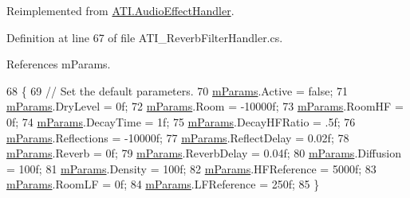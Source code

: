 Reimplemented from \hyperlink{class_a_t_i_1_1_audio_effect_handler_a9f2b5ce4ce7b2e3a7cca147a87733a77}{A\+T\+I.\+Audio\+Effect\+Handler}.



Definition at line 67 of file A\+T\+I\+\_\+\+Reverb\+Filter\+Handler.\+cs.



References m\+Params.


\begin{DoxyCode}
68     \{
69         \textcolor{comment}{// Set the default parameters.}
70         \hyperlink{class_a_t_i___reverb_filter_handler_a034260fbce2052b42bceddc891632347}{mParams}.Active = \textcolor{keyword}{false};
71         \hyperlink{class_a_t_i___reverb_filter_handler_a034260fbce2052b42bceddc891632347}{mParams}.DryLevel = 0f;
72         \hyperlink{class_a_t_i___reverb_filter_handler_a034260fbce2052b42bceddc891632347}{mParams}.Room = -10000f;
73         \hyperlink{class_a_t_i___reverb_filter_handler_a034260fbce2052b42bceddc891632347}{mParams}.RoomHF = 0f;
74         \hyperlink{class_a_t_i___reverb_filter_handler_a034260fbce2052b42bceddc891632347}{mParams}.DecayTime = 1f;
75         \hyperlink{class_a_t_i___reverb_filter_handler_a034260fbce2052b42bceddc891632347}{mParams}.DecayHFRatio = .5f;
76         \hyperlink{class_a_t_i___reverb_filter_handler_a034260fbce2052b42bceddc891632347}{mParams}.Reflections = -10000f;
77         \hyperlink{class_a_t_i___reverb_filter_handler_a034260fbce2052b42bceddc891632347}{mParams}.ReflectDelay = 0.02f;
78         \hyperlink{class_a_t_i___reverb_filter_handler_a034260fbce2052b42bceddc891632347}{mParams}.Reverb = 0f;
79         \hyperlink{class_a_t_i___reverb_filter_handler_a034260fbce2052b42bceddc891632347}{mParams}.ReverbDelay = 0.04f;
80         \hyperlink{class_a_t_i___reverb_filter_handler_a034260fbce2052b42bceddc891632347}{mParams}.Diffusion = 100f;
81         \hyperlink{class_a_t_i___reverb_filter_handler_a034260fbce2052b42bceddc891632347}{mParams}.Density = 100f;
82         \hyperlink{class_a_t_i___reverb_filter_handler_a034260fbce2052b42bceddc891632347}{mParams}.HFReference = 5000f;
83         \hyperlink{class_a_t_i___reverb_filter_handler_a034260fbce2052b42bceddc891632347}{mParams}.RoomLF = 0f;
84         \hyperlink{class_a_t_i___reverb_filter_handler_a034260fbce2052b42bceddc891632347}{mParams}.LFReference = 250f;
85     \}
\end{DoxyCode}
\mbox{\label{class_a_t_i___reverb_filter_handler_af9e294ce4222c0e564ea864c14106e7e}} 
